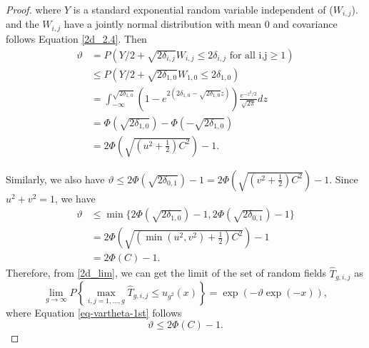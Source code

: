 \documentclass{article}
\begin{document}
\begin{appendices}
\begin{proof}
		where $Y$ is a standard exponential random variable independent of ($W_{i,j}$). and the $W_{i,j}$ have a jointly normal distribution with mean 0 and covariance follows Equation \eqref{2d_2.4}.
		Then
		\begin{equation*}
			\begin{aligned}
				\vartheta&=P(Y/2+\sqrt{2\delta_{i,j}}W_{i,j}\leq2\delta_{i,j}\text{ for all i,j}\geq1)\\
				&\leq P(Y/2+\sqrt{2\delta_{1,0}}W_{1,0}\leq2\delta_{1,0})\\
				&= \int_{-\infty}^{\sqrt{2\delta_{1,0}}}(1-e^{2(2\delta_{1,0}-\sqrt{2\delta_{1,0}}z)})\frac{e^{-z^2/2}}{\sqrt{2\pi}} dz  \\
				&= \Phi(\sqrt{2\delta_{1,0}})-\Phi(-\sqrt{2\delta_{1,0}}) \\
				&=2\Phi(\sqrt{(u^2+\frac{1}{2})C^2})-1.
			\end{aligned} 
		\end{equation*}
		
		Similarly, we also have $\vartheta\leq2\Phi(\sqrt{2\delta_{0,1}})-1=2\Phi(\sqrt{(v^2+\frac{1}{2})C^2})-1$. Since $u^2+v^2=1$, we have 
		\begin{equation*}
			\begin{aligned}
				\vartheta&\leq\min\{2\Phi(\sqrt{2\delta_{1,0}})-1,2\Phi(\sqrt{2\delta_{0,1}})-1\}\\
				&=2\Phi(\sqrt{(\min(u^2,v^2)+\frac{1}{2})C^2})-1\\
				&=2\Phi(C)-1.
			\end{aligned} 
		\end{equation*}
		Therefore, from \eqref{2d_lim}, we can get the limit of the set of random fields $\hat{T}_{g,i,j}$ as 
		\begin{equation*}
			\lim_{g\rightarrow\infty}P\left\{\max_{i,j=1,...,g}\hat{T}_{g,i,j}\leq u_{g^2}(x)\right\}=\exp(-\vartheta \exp(-x)),
		\end{equation*}
		where Equation \ref{eq-vartheta-1st} follows
		\begin{equation*}
			\vartheta\leq2\Phi(C)-1.
		\end{equation*}
		

\end{proof}
\end{appendices}
\end{document}
